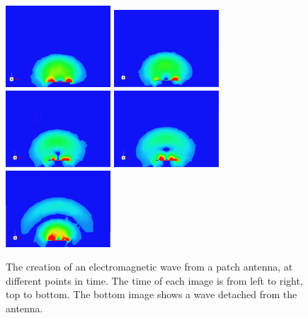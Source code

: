 \documentclass[12pt]{article}
\begin{document}
\begin{figure}[h]
    \centering
    \includegraphics[width=0.35\textwidth]{basic-patch-antenna-radiating-t0.png} 
    \includegraphics[width=0.35\textwidth]{basic-patch-antenna-radiating-t1.png}
    \includegraphics[width=0.35\textwidth]{basic-patch-antenna-radiating-t2.png}
    \includegraphics[width=0.35\textwidth]{basic-patch-antenna-radiating-t3.png}
    \includegraphics[width=0.35\textwidth]{basic-patch-antenna-radiating-t4.png}
    \caption{The creation of an electromagnetic wave from a patch antenna, at different points in time. The time of each image is from left to right, top to bottom. The bottom image shows a wave detached from the antenna.}
\end{figure} 
\end{document}
